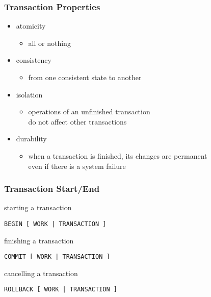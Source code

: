 \documentclass[dvipsnames]{beamer}
\theoremstyle{plain}
\begin{document}
\begin{frame}
  \frametitle{Transaction Properties}

  \begin{itemize}
    \item atomicity
    \begin{itemize}
      \item all or nothing
    \end{itemize}

    \pause
    \item consistency
    \begin{itemize}
      \item from one consistent state to another
    \end{itemize}

    \pause
    \item isolation
    \begin{itemize}
      \item operations of an unfinished transaction\\
	do not affect other transactions
    \end{itemize}

    \pause
    \item durability
    \begin{itemize}
      \item when a transaction is finished, its changes are permanent\\
	even if there is a system failure
    \end{itemize}
  \end{itemize}
\end{frame}

\begin{frame}[fragile]
  \frametitle{Transaction Start/End}

  \begin{block}{starting a transaction}
    \begin{lstlisting}
BEGIN [ WORK | TRANSACTION ]
    \end{lstlisting}
  \end{block}

  \pause
  \begin{block}{finishing a transaction}
    \begin{lstlisting}
COMMIT [ WORK | TRANSACTION ]
    \end{lstlisting}
  \end{block}

  \pause
  \begin{block}{cancelling a transaction}
    \begin{lstlisting}
ROLLBACK [ WORK | TRANSACTION ]
    \end{lstlisting}
  \end{block}
\end{frame}
\end{document}
